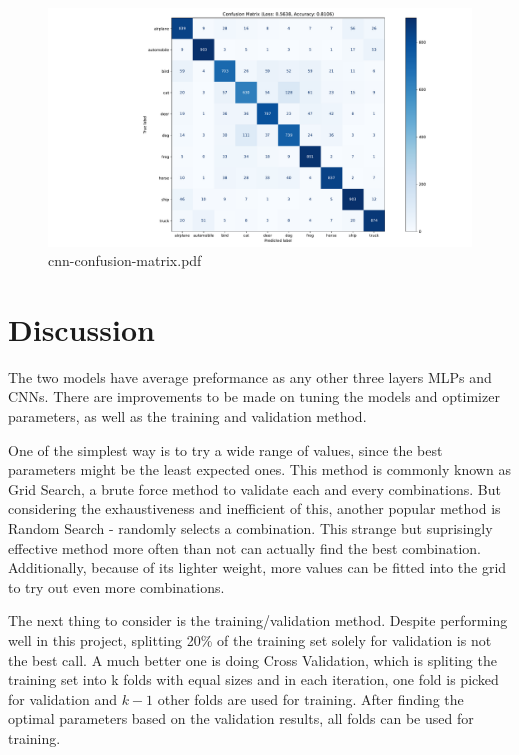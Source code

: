 \documentclass{report}
\begin{document}
\begin{figure}[ht!]
    \center
    \includegraphics[scale=0.41]{../output/cnn-confusion-matrix.pdf}
    \caption{cnn-confusion-matrix.pdf}
\end{figure}

\section{Discussion}
The two models have average preformance as any other three layers MLPs and CNNs. There are improvements 
to be made on tuning the models and optimizer parameters, as well as the training and validation method. 

One of the simplest way is to try a wide range of values, since the best parameters might be the least 
expected ones. This method is commonly known as Grid Search, a brute force method to validate each and 
every combinations. But considering the exhaustiveness and inefficient of this, another popular method is 
Random Search - randomly selects a combination. This strange but suprisingly effective method more often 
than not can actually find the best combination. Additionally, because of its lighter weight, more values
can be fitted into the grid to try out even more combinations.

The next thing to consider is the training/validation method. Despite performing well in this project, splitting 20\%
of the training set solely for validation is not the best call. A much better one is doing Cross Validation, 
which is spliting the training set into k folds with equal sizes and in each iteration, one fold is picked for
validation and $k-1$ other folds are used for training. After finding the optimal parameters based on the validation results,
all folds can be used for training.

\begingroup
\let\clearpage\relax
\end{document}
